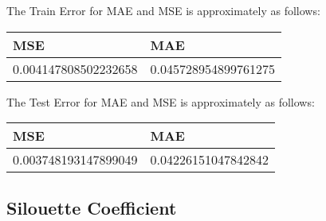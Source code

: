\documentclass[8pt]{extarticle}
\begin{document}
The Train Error for MAE and MSE is approximately as follows:

\begin{longtable}[]{@{}ll@{}}
\toprule
MSE & MAE\tabularnewline
\midrule
\endhead
0.004147808502232658 & 0.045728954899761275\tabularnewline
\bottomrule
\end{longtable}

The Test Error for MAE and MSE is approximately as follows:

\begin{longtable}[]{@{}ll@{}}
\toprule
MSE & MAE\tabularnewline
\midrule
\endhead
0.003748193147899049 & 0.04226151047842842\tabularnewline
\bottomrule
\end{longtable}

    \hypertarget{silouette-coefficient}{%
\subsection{Silouette Coefficient}\label{silouette-coefficient}}
\end{document}
